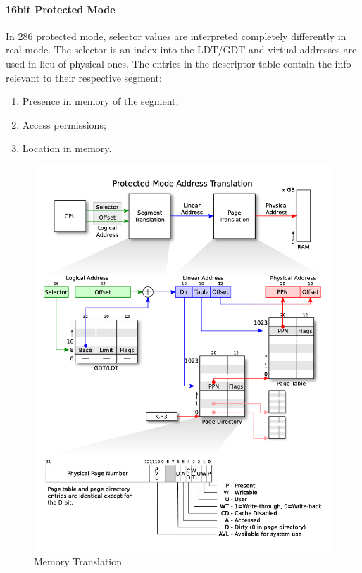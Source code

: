 \documentclass[paper=a4, fontsize=11pt]{report} %
\numberwithin{equation}{section} %
\numberwithin{figure}{section} %
\numberwithin{table}{section} %
\begin{document}
\paragraph{16bit Protected Mode}
In 286 protected mode, selector values are interpreted completely differently in
real mode. The selector is an index into the LDT/GDT and virtual addresses are
used in lieu of physical ones. The entries in the descriptor table contain the
info relevant to their respective segment:
\begin{enumerate}
  \item Presence in memory of the segment;
  \item Access permissions;
  \item Location in memory.
\end{enumerate}
\begin{figure}
	\begin{center}
		\includegraphics[scale=0.5]{./pics/x86_translation.pdf}
		\caption{Memory Translation}
	\label{memtrans}
	\end{center}
\end{figure}
\end{document}
